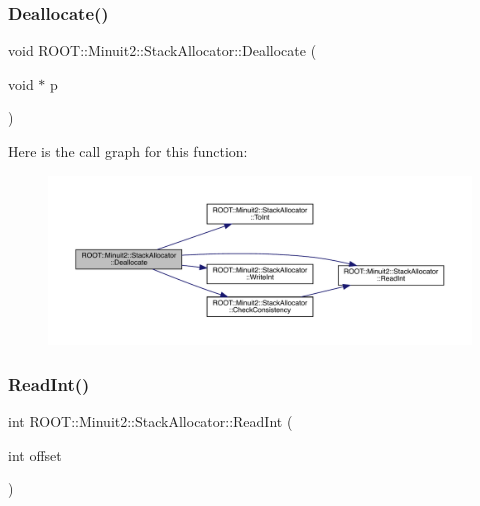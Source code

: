 \subsubsection{\texorpdfstring{Deallocate()}{Deallocate()}\hspace{0.1cm}{\footnotesize\ttfamily [2/2]}}
{\footnotesize\ttfamily void R\+O\+O\+T\+::\+Minuit2\+::\+Stack\+Allocator\+::\+Deallocate (\begin{DoxyParamCaption}\item[{void $\ast$}]{p }\end{DoxyParamCaption})\hspace{0.3cm}{\ttfamily [inline]}}

Here is the call graph for this function\+:
\nopagebreak
\begin{figure}[H]
\begin{center}
\leavevmode
\includegraphics[width=350pt]{d3/d1e/classROOT_1_1Minuit2_1_1StackAllocator_ac36426e01e1474491cef1b203dba2f0c_cgraph}
\end{center}
\end{figure}
\mbox{\label{classROOT_1_1Minuit2_1_1StackAllocator_a811df825be4e6f67dc5a9139eb2edfdd}} 
\subsubsection{\texorpdfstring{ReadInt()}{ReadInt()}\hspace{0.1cm}{\footnotesize\ttfamily [1/2]}}
{\footnotesize\ttfamily int R\+O\+O\+T\+::\+Minuit2\+::\+Stack\+Allocator\+::\+Read\+Int (\begin{DoxyParamCaption}\item[{int}]{offset }\end{DoxyParamCaption})\hspace{0.3cm}{\ttfamily [inline]}}

